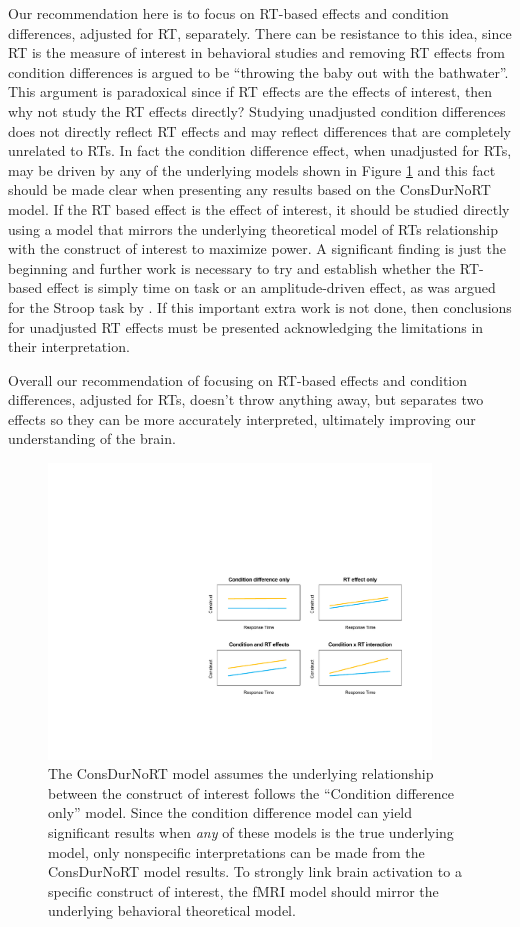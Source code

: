\documentclass[titlepage,12pt] {article}
\begin{document}
Our recommendation here is to focus on RT-based effects and condition differences, adjusted for RT, separately.  There can be resistance to this idea, since RT is the measure of interest in behavioral studies and removing RT effects from condition differences is argued to be ``throwing the baby out with the bathwater''.  This argument is paradoxical since if RT effects are the effects of interest, then why not study the RT effects directly? Studying unadjusted condition differences does not directly reflect RT effects and may reflect differences that are completely unrelated to RTs.  In fact the condition difference effect, when unadjusted for RTs, may be driven by any of the underlying models shown in Figure \ref{fig:underlying-theory} and this fact should be made clear when presenting any results based on the ConsDurNoRT model.  If the RT based effect is the effect of interest, it should be studied directly using a model that mirrors the underlying theoretical model of RTs relationship with the construct of interest to maximize power.  A significant finding is just the beginning and further work is necessary to try and establish whether the RT-based effect is simply time on task or an amplitude-driven effect, as was argued for the Stroop task by \citet{yeung_errors_2011}.  If this important extra work is not done, then conclusions for unadjusted RT effects must be presented acknowledging the limitations in their interpretation.

Overall our recommendation of focusing on RT-based effects and condition differences, adjusted for RTs, doesn't throw anything away, but separates two effects so they can be more accurately interpreted, ultimately improving our understanding of the brain. 

\begin{figure}
  \centering
   \includegraphics[width=4in]{Figures/underlying_theory_models.pdf}
   \caption{The ConsDurNoRT model assumes the underlying relationship between the construct of interest follows the ``Condition difference only'' model.  Since the condition difference model can yield significant results when \emph{any} of these models is the true underlying model, only nonspecific interpretations can be made from the ConsDurNoRT model results.  To strongly link brain activation to a specific construct of interest, the fMRI model should mirror the underlying behavioral theoretical model.}
  \label{fig:underlying-theory}
\end{figure}
\end{document}
